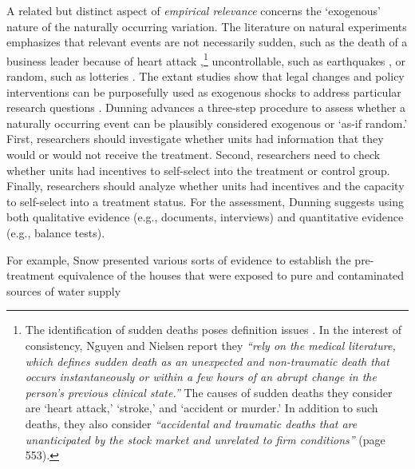 \documentclass[11pt]{article}
\begin{document}
\begin{refsection}
A related but distinct aspect of \textit{empirical relevance} concerns the `exogenous' nature of the naturally occurring variation. The literature on natural experiments emphasizes that relevant events are not necessarily sudden, such as the death of a business leader because of heart attack \autocite[e.g.,][]{nguyen_et_al_2010},\footnote{The identification of sudden deaths poses definition issues \autocite[e.g.,][]{azoulay_et_al_2010,oettl_2012}.  In the interest of consistency, Nguyen and Nielsen \autocite*{nguyen_et_al_2010} report they \textit{``rely on the medical literature, which defines sudden death as an unexpected and non-traumatic death that occurs instantaneously or within a few hours of an abrupt change in the person’s previous clinical state.''} The causes of sudden deaths they consider are `heart attack,' `stroke,' and `accident or murder.' In addition to such deaths, they also consider \textit{``accidental and traumatic deaths that are unanticipated by the stock market and unrelated to firm conditions''} (page 553). } uncontrollable, such as earthquakes \autocite[e.g.,][]{belloc_et_al_2016}, or random, such as lotteries \autocite[e.g.,][]{poulos_2019}. The extant studies show that legal changes and policy interventions can be purposefully used as exogenous shocks to address particular research questions \autocites[e.g.,][]{beaman_et_al_2012, matsa_miller_2013,chauchard_2014}. Dunning \autocite*[][page 236]{dunning_2012} advances a three-step procedure to assess whether a naturally occurring event can be plausibly considered exogenous or `as-if random.' First, researchers should investigate whether units had information that they would or would not receive the treatment. Second, researchers need to check whether units had incentives to self-select into the treatment or control group. Finally, researchers should analyze whether units had incentives and the capacity to self-select into a treatment status. For the assessment, Dunning \autocite*{dunning_2012} suggests using both qualitative evidence (e.g., documents, interviews) and quantitative evidence (e.g., balance tests).

For example, Snow \autocite*{snow_1855} presented various sorts of evidence to establish the pre-treatment equivalence of the houses that were exposed to pure and contaminated sources of water supply


\end{refsection}
\end{document}
